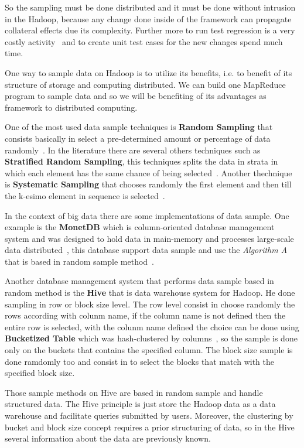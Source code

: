 So the sampling must be done distributed and it must be done without intrusion
in the Hadoop, because any change done inside of the framework can propagate collateral
effects due its complexity. Further more to run test regression is a very costly
activity~\cite{hadoopUnit} and to create unit test cases for the new changes spend
much time.

One way to sample data on Hadoop is to utilize its benefits, i.e. to benefit of
its structure of storage and computing distributed. We can build one MapReduce
program to sample data and so we will be benefiting of its advantages as framework
to distributed computing.

One of the most used data sample techniques is {\bf Random Sampling} that consists
basically in select a pre-determined amount or percentage of data randomly~\cite{randomsampling}.
In the literature there are several others techniques such as {\bf Stratified Random Sampling},
this techniques splits the data in strata in which each element has the same chance
of being selected~\cite{randomsampling}. Another thechnique is {\bf Systematic Sampling}
that chooses randomly the first element and then till the k-esimo element in sequence
is selected~\cite{systematicsampling}.

In the context of big data there are some implementations of data sample. One example
is the {\bf MonetDB} which is column-oriented database management system and was
designed to hold data in main-memory and processes large-scale data distributed~\cite{monetDB},
this database support data sample and use the {\it Algorithm A} that is based in
random sample method~\cite{vitter:1984}.

Another database management system that performs data sample based in random method
is the {\bf Hive} that is data warehouse system for Hadoop. He done sampling in
row or block size level. The row level consist in choose randomly the rows
according with colunm name, if the column name is not defined then the entire row
is selected, with the colunm name defined the choice can be done using
{\bf Bucketized Table} which was hash-clustered by columns~\cite{hiveSample},
so the sample is done only on the buckets that contains the specified column. 
The block size sample is done ramdomly too and consist in to select the blocks that
match with the specified block size.

Those sample methods on Hive are based in random sample and handle structured data.
The Hive principle is just store the Hadoop data as a data warehouse and facilitate
queries submitted by users. Moreover, the clustering by bucket and block size concept requires a
prior structuring of data, so in the Hive several information about the data are
previously known.

